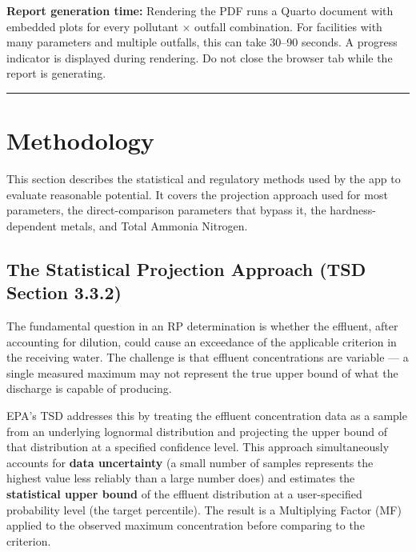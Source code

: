 \documentclass[
  11pt,
  letterpaper,
  DIV=11,
  numbers=noendperiod]{scrartcl}
\begin{document}
\begin{tcolorbox}[enhanced jigsaw, arc=.35mm, bottomrule=.15mm, bottomtitle=1mm, breakable, colback=white, colbacktitle=quarto-callout-note-color!10!white, colframe=quarto-callout-note-color-frame, coltitle=black, left=2mm, leftrule=.75mm, opacityback=0, opacitybacktitle=0.6, rightrule=.15mm, title=\textcolor{quarto-callout-note-color}{\faInfo}\hspace{0.5em}{Note}, titlerule=0mm, toprule=.15mm, toptitle=1mm]

\textbf{Report generation time:} Rendering the PDF runs a Quarto
document with embedded plots for every pollutant × outfall combination.
For facilities with many parameters and multiple outfalls, this can take
30--90 seconds. A progress indicator is displayed during rendering. Do
not close the browser tab while the report is generating.

\end{tcolorbox}

\begin{center}\rule{0.5\linewidth}{0.5pt}\end{center}

\section{Methodology}\label{sec-methodology}

This section describes the statistical and regulatory methods used by
the app to evaluate reasonable potential. It covers the projection
approach used for most parameters, the direct-comparison parameters that
bypass it, the hardness-dependent metals, and Total Ammonia Nitrogen.

\subsection{The Statistical Projection Approach (TSD Section
3.3.2)}\label{sec-statistical-approach}

The fundamental question in an RP determination is whether the effluent,
after accounting for dilution, could cause an exceedance of the
applicable criterion in the receiving water. The challenge is that
effluent concentrations are variable --- a single measured maximum may
not represent the true upper bound of what the discharge is capable of
producing.

EPA's TSD addresses this by treating the effluent concentration data as
a sample from an underlying lognormal distribution and projecting the
upper bound of that distribution at a specified confidence level. This
approach simultaneously accounts for \textbf{data uncertainty} (a small
number of samples represents the highest value less reliably than a
large number does) and estimates the \textbf{statistical upper bound} of
the effluent distribution at a user-specified probability level (the
target percentile). The result is a Multiplying Factor (MF) applied to
the observed maximum concentration before comparing to the criterion.
\end{document}
